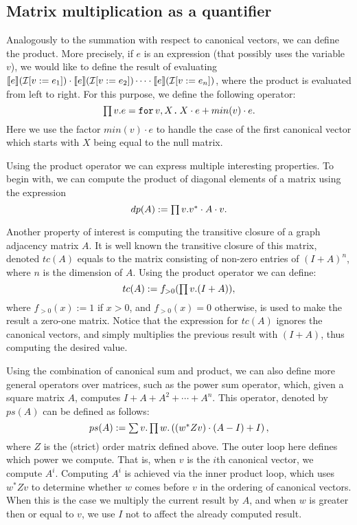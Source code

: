 \subsection{Matrix multiplication as a quantifier}

Analogously to the summation with respect to canonical vectors, we can define the product. More precisely, 
if $e$ is an \langfor expression (that possibly uses the variable $v$), we would like to define the result of evaluating $\llbracket e \rrbracket(\mathcal{I}[v := e_1]) \cdot \llbracket e \rrbracket(\mathcal{I}[v := e_2])\cdots \cdot \llbracket e \rrbracket(\mathcal{I}[v := e_n])$, where the product is evaluated from left to right. For this purpose, we define the following operator:
$$\textstyle\prod v. e=\texttt{for}\, v,X \texttt{.}\, X\cdot e + min(v)\cdot e.$$
Here we use the factor $min(v)\cdot e$ to handle the case of the first canonical vector which starts with $X$ being equal to the null matrix. 

Using the product operator we can express multiple interesting properties. To begin with, we can compute the product of diagonal elements of a matrix using the expression $$dp(A) := \textstyle\prod v. v^*\cdot A \cdot v.$$

Another property of interest is computing the transitive closure of a graph adjacency matrix $A$. It is well known the transitive closure of this matrix, denoted $tc(A)$ equals to the matrix consisting of non-zero entries of $(I + A)^n$, where $n$ is the dimension of $A$. Using the product operator we can define:
$$tc(A) := f_{>0}(\textstyle\prod v. (I + A)),$$
where $f_{>0}(x) := 1$ if $x>0$, and $f_{>0}(x) = 0$ otherwise, is used to make the result a zero-one matrix. Notice that the expression for $tc(A)$ ignores the canonical vectors, and simply multiplies the previous result with $(I + A)$, thus computing the desired value.

Using the combination of canonical sum and product, we can also define more general operators over matrices, such as the power sum operator, which, given a square matrix $A$, computes $I + A + A^2 + \cdots + A^n$. This operator, denoted by $ps(A)$ can be defined as follows:
$$ps(A) := \textstyle\sum v.\textstyle\prod w. \left( (w^*Zv)\cdot (A-I) + I\right),$$
where $Z$ is the (strict) order matrix defined above. The outer loop here defines which power we compute. That is, when $v$ is the $i$th canonical vector, we compute $A^i$. Computing $A^i$ is achieved via the inner product loop, which uses $w^*Zv$ to determine whether $w$ comes before $v$ in the ordering of canonical vectors. When this is the case we multiply the current result by $A$, and when $w$ is greater then or equal to $v$, we use $I$ not to affect the already computed result.

